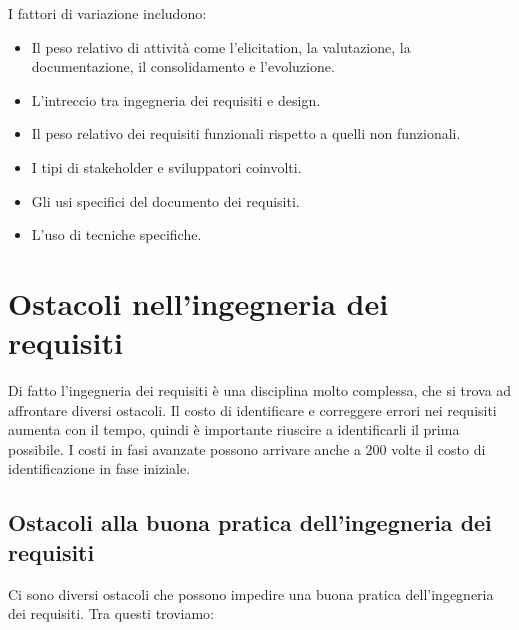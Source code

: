I fattori di variazione includono:

\begin{itemize}
    \item Il peso relativo di attività come l'elicitation, la valutazione,
    la documentazione, il consolidamento e l'evoluzione.
    \item L'intreccio tra ingegneria dei requisiti e design.
    \item Il peso relativo dei requisiti funzionali rispetto a quelli non
    funzionali.
    \item I tipi di stakeholder e sviluppatori coinvolti.
    \item Gli usi specifici del documento dei requisiti.
    \item L'uso di tecniche specifiche.
\end{itemize}

\section{Ostacoli nell'ingegneria dei requisiti}
Di fatto l'ingegneria dei requisiti è una disciplina molto complessa,
che si trova ad affrontare diversi ostacoli. Il costo di identificare 
e correggere errori nei requisiti aumenta con il tempo, quindi è
importante riuscire a identificarli il prima possibile.
I costi in fasi avanzate possono arrivare anche a $200$ volte il costo  
di identificazione in fase iniziale.

\subsection{Ostacoli alla buona pratica dell'ingegneria dei requisiti}

Ci sono diversi ostacoli che possono impedire una buona pratica dell'ingegneria
dei requisiti. Tra questi troviamo:

